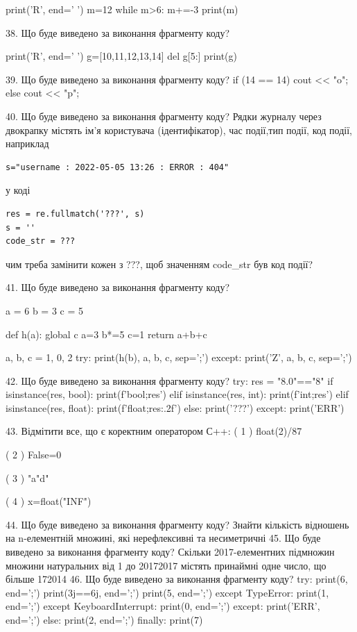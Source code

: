 \documentclass[11pt]{article}
\begin{document}
print('R', end=' ')
m=12
while m>6:
    m+=-3
print(m)


38. Що буде виведено за виконання фрагменту коду?

print('R', end=' ')
g=[10,11,12,13,14]
del g[5:]
print(g)


39. Що буде виведено за виконання фрагменту коду?
if (14 == 14)
    cout << "o";
else
    cout << "p";


40. Що буде виведено за виконання фрагменту коду?
Рядки журналу через двокрапку містять ім'я користувача (ідентифікатор), час події,тип події, код події, наприклад
\begin{verbatim}
s="username : 2022-05-05 13:26 : ERROR : 404"
\end{verbatim}
у коді 
\begin{verbatim}
res = re.fullmatch('???', s) 
s = ''
code_str = ??? 
\end{verbatim}
чим треба замінити кожен з ???, щоб значенням code\_str був код події? 



41. Що буде виведено за виконання фрагменту коду?

a = 6
b = 3
c = 5

def h(a):
global c    a=3
    b*=5
    c=1
    return a+b+c

a, b, c = 1, 0, 2
try:
    print(h(b), a, b, c, sep=';')
except:
    print('Z', a, b, c, sep=';')

42. Що буде виведено за виконання фрагменту коду?
try:
    res = "8.0"=="8"
    if isinstance(res, bool):
        print(f'bool;{res}')
    elif isinstance(res, int):
        print(f'int;{res}')
    elif isinstance(res, float):
        print(f'float;{res:.2f}')
    else:
        print('???')
except:
    print('ERR')

43. %
Відмітити все, що є коректним оператором С++:
( 1 ) float(2)/87

( 2 ) False=0

( 3 ) "a"d"

( 4 ) x=float("INF")

44. Що буде виведено за виконання фрагменту коду?
Знайти кількість відношень на n-елементній множині, які нерефлексивні та несиметричні
45. Що буде виведено за виконання фрагменту коду?
Скільки 2017-елементних підмножин множини натуральних від 1 до 20172017 містять принаймні одне число, що більше 172014
46. Що буде виведено за виконання фрагменту коду?
try:
    print(6, end=';')
    print(3j==6j, end=';')
    print(5, end=';')
except TypeError:
    print(1, end=';')
except KeyboardInterrupt:
    print(0, end=';')
except:
    print('ERR', end=';')
else:
    print(2, end=';')
finally:
    print(7)
\end{document}
